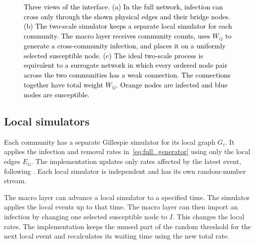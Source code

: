 \documentclass[a4paper,fleqn]{cas-sc}
\begin{document}
\begin{figure}[tbp]
\caption{\textcolor{black}{Three views of the interface. (a) In the full network, infection can cross only through the shown physical edges and their bridge nodes. (b) The two-scale simulator keeps a separate local simulator for each community. The macro layer receives community counts, uses $W_{ij}$ to generate a cross-community infection, and places it on a uniformly selected susceptible node. (c) The ideal two-scale process is equivalent to a surrogate network in which every ordered node pair across the two communities has a weak connection. The connections together have total weight $W_{ij}$. Orange nodes are infected and blue nodes are susceptible.}}
\label{fig:schematic}
\end{figure}

\subsection{Local simulators}
\label{sec:local}

Each community has a separate Gillespie simulator for its local graph $G_i$. It applies the infection and removal rates in~\eqref{eq:full_generator} using only the local edges $E_{ii}$. The implementation updates only rates affected by the latest event, following \citet{kuryliak2025simulating}. Each local simulator is independent and has its own random-number stream.

The macro layer can advance a local simulator to a specified time. The simulator applies the local events up to that time. The macro layer can then import an infection by changing one selected susceptible node to $I$. This changes the local rates. The implementation keeps the unused part of the random threshold for the next local event and recalculates its waiting time using the new total rate.
\end{document}
